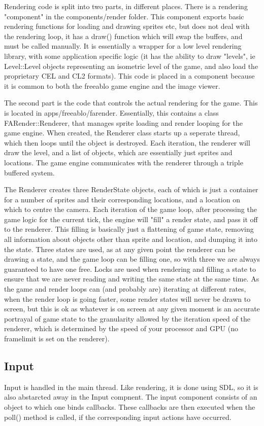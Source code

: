     Rendering code is split into two parts, in different places. There is a rendering "component" in the components/render folder.
    This component exports basic rendering functions for loading and drawing sprites etc, but does not deal with the rendering loop, it has a draw() function which will swap the buffers, and must be called manually.   
    It is essentially a wrapper for a low level rendering library, with some application specific logic (it has the ability to draw "levels", ie Level::Level objects representing an isometric level of the game, and also load the proprietary CEL and CL2 formats).
    This code is placed in a component because it is common to both the freeablo game engine and the image viewer.
    
    \mbox{}
    
    The second part is the code that controls the actual rendering for the game. This is located in apps/freeablo/farender. Essentially, this contains a class FARender::Renderer, that manages sprite loading and render looping for the game engine.  
    When created, the Renderer class starts up a seperate thread, which then loops until the object is destroyed. Each iteration, the renderer will draw the level, and a list of objects, which are essentially just sprites and locations.
    The game engine communicates with the renderer through a triple buffered system.
    
    The Renderer creates three RenderState objects, each of which is just a container for a number of sprites and their corresponding locations, and a location on which to centre the camera.
    Each iteration of the game loop, after processing the game logic for the current tick, the engine will "fill" a render state, and pass it off to the renderer. This filling is basically just a flattening of game state, removing all information about objects other than sprite and location, and dumping it into the state.
    Three states are used, as at any given point the renderer can be drawing a state, and the game loop can be filling one, so with three we are always guaranteed to have one free.
    Locks are used when rendering and filling a state to ensure that we are never reading and writing the same state at the same time.
    As the game and render loops can (and probably are) iterating at different rates, when the render loop is going faster, some render states will never be drawn to screen, but this is ok as whatever is on screen at any given moment is an accurate portrayal of game state to the granularity allowed by the iteration speed of the renderer, which is determined by the speed of your processor and GPU (no framelimit is set on the renderer).
        
    \subsection{Input}
    Input is handled in the main thread. Like rendering, it is done using SDL, so it is also abstarcted away in the Input compnent.
    The input component consists of an object to which one binds callbacks. These callbacks are then executed when the poll() method is called, if the corresponding input actions have occurred.
